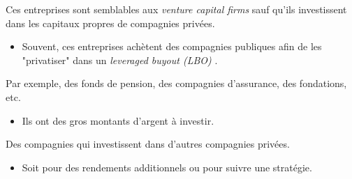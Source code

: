 \documentclass[10pt, french]{article}
\begin{document}
\begin{multicols*}{2}
\begin{definitionNOHFILLsub}
Ces entreprises sont semblables aux \og \textit{venture capital firms} \fg{} sauf qu'ils investissent dans les capitaux propres de compagnies privées. 
\begin{itemize}
	\item	Souvent, ces entreprises achètent des compagnies publiques afin de les "privatiser" dans un \og \textit{leveraged buyout (LBO)} \fg{}.
\end{itemize}
\end{definitionNOHFILLsub}

\begin{definitionNOHFILLsub}
Par exemple, des fonds de pension, des compagnies d'assurance, des fondations, etc.
\begin{itemize}
	\item	Ils ont des gros montants d'argent à investir.
\end{itemize}
\end{definitionNOHFILLsub}

\begin{definitionNOHFILLsub}
Des compagnies qui investissent dans d'autres compagnies privées.
\begin{itemize}
	\item	Soit pour des rendements additionnels ou pour suivre une stratégie.
\end{itemize}
\end{definitionNOHFILLsub}



\end{multicols*}
\end{document}
